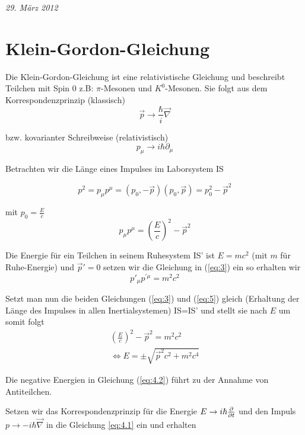 
 



\textit{29. März 2012}


\section*{Klein-Gordon-Gleichung}


Die Klein-Gordon-Gleichung ist eine relativistische Gleichung und beschreibt Teilchen mit Spin 0 z.B: \(\pi\)-Mesonen und \(K^0\)-Mesonen. Sie folgt aus dem Korrespondenzprinzip (klassisch)
\begin{equation}
  \label{eq:1}
  \vec p \rightarrow \frac{\hbar}{i}\vec\nabla 
\end{equation}

bzw. kovarianter Schreibweise (relativistisch)
\begin{equation}
  \label{eq:2}
  p_\mu \rightarrow i\hbar \partial_\mu
\end{equation}

Betrachten wir die Länge eines Impulses im Laborsystem IS

\[p^2 = p_\mu p^\mu = (p_0,-\vec p) (p_0,\vec p) =  p_0^2 -\vec p^2\]

mit \(p_0 = \frac{E}{c}\) 
\begin{equation}
  \label{eq:3}
  p_\mu p^\mu =  \left( \frac{E}{c}\right)^2 -\vec p^2
\end{equation}


Die Energie für ein Teilchen in seinem Ruhesystem IS' ist \(E=mc^2\) (mit \(m\) für Ruhe-Energie) und \(\vec p' = 0\) setzen wir die Gleichung in (\ref{eq:3}) ein so erhalten wir
\begin{equation}
  \label{eq:5}
   p'_\mu p^{'\mu} = m^2c^2
\end{equation}

Setzt man nun die beiden Gleichungen (\ref{eq:3}) und (\ref{eq:5}) gleich (Erhaltung der Länge des Impulses in allen Inertialsystemen) IS=IS'  und stellt sie nach \(E\) um somit folgt
\begin{align}
  \left( \frac{E}{c}\right)^2 -\vec p^2  = m^2c^2    \label{eq:4.1} \\
\Leftrightarrow E = \pm \sqrt{\vec p^2c^2 + m^2c^4}  \label{eq:4.2}
\end{align}

Die negative Energien in Gleichung (\ref{eq:4.2}) führt zu der Annahme von Antiteilchen.

Setzen wir das Korrespondenzprinzip für die Energie \(E \to i\hbar\pdiff_t \) und den Impuls \(p \to -i\hbar \vec\nabla\) in die Gleichung \eqref{eq:4.1} ein und erhalten

